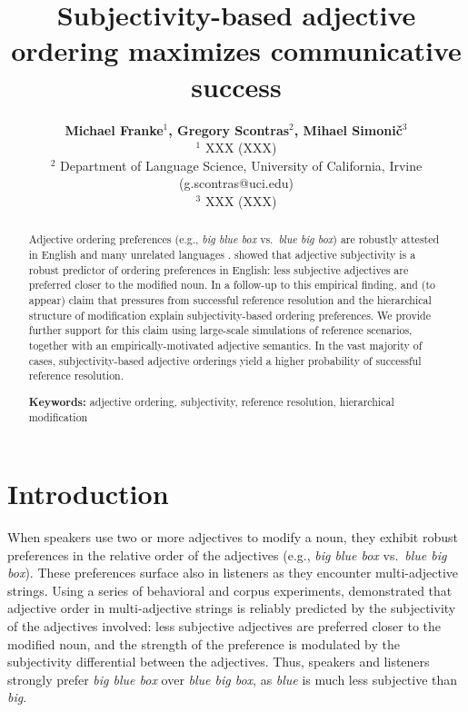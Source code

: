 \documentclass[10pt,a4paper]{article}
\title{Subjectivity-based adjective ordering maximizes communicative success}
\author{\large \textbf{Michael Franke$^1$, Gregory Scontras$^2$, Mihael Simoni\v{c}$^3$}\\
\gcs{are we okay with an alphabetical author listing?} $^1$ XXX (XXX)\\
$^2$ Department of Language Science, University of California, Irvine (g.scontras@uci.edu)\\
$^3$ XXX (XXX)}
\begin{document}
\maketitle

\begin{abstract}
Adjective ordering preferences (e.g., \emph{big blue box} vs.~\emph{blue big box}) are robustly attested in English and many unrelated languages \cite{dixon1982}.  showed that adjective subjectivity is a robust predictor of ordering preferences in English: less subjective adjectives are preferred closer to the modified noun. In a follow-up to this empirical finding,  and \citeauthor{scontrasetalSPadjectives} (to appear) claim that pressures from successful reference resolution and the hierarchical structure of modification explain subjectivity-based ordering preferences. We provide further support for this claim using large-scale simulations of reference scenarios, together with an empirically-motivated adjective semantics. In the vast majority of cases, subjectivity-based adjective orderings yield a higher probability of successful reference resolution.


\textbf{Keywords:} 
adjective ordering, subjectivity, reference resolution, hierarchical modification

\end{abstract}

\section{Introduction}

When speakers use two or more adjectives to modify a noun, they exhibit robust preferences in the relative order of the adjectives (e.g., \emph{big blue box} vs.~\emph{blue big box}). These preferences surface also in listeners as they encounter multi-adjective strings. Using a series of behavioral and corpus experiments,  demonstrated that adjective order in multi-adjective strings is reliably predicted by the subjectivity of the adjectives involved: less subjective adjectives are preferred closer to the modified noun, and the strength of the preference is modulated by the subjectivity differential between the adjectives. Thus, speakers and listeners strongly prefer \emph{big blue box} over \emph{blue big box}, as \emph{blue} is much less subjective than \emph{big}.
\end{document}
